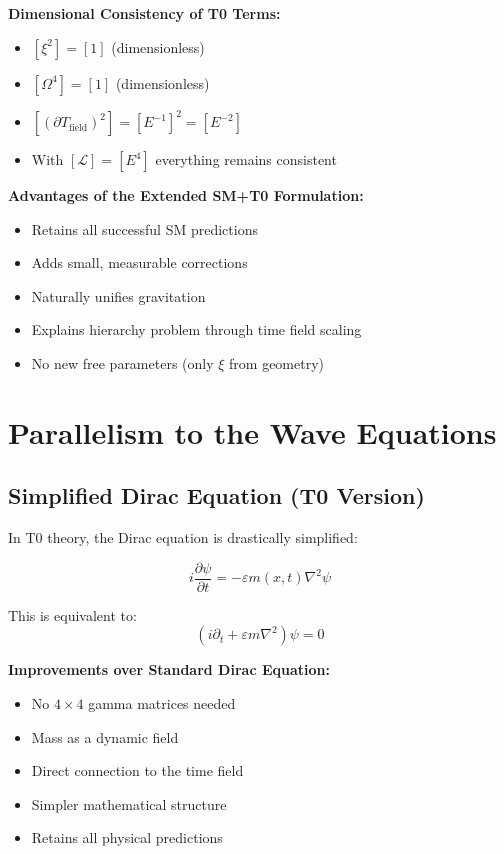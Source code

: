 	\textbf{Dimensional Consistency of T0 Terms:}
	\begin{itemize}
		\item $[\xi^2] = [1]$ (dimensionless)
		\item $[\Omega^4] = [1]$ (dimensionless)
		\item $[(\partial T_{\text{field}})^2] = [E^{-1}]^2 = [E^{-2}]$
		\item With $[\mathcal{L}] = [E^4]$ everything remains consistent
	\end{itemize}
	
	\textbf{Advantages of the Extended SM+T0 Formulation:}
	\begin{itemize}
		\item Retains all successful SM predictions
		\item Adds small, measurable corrections
		\item Naturally unifies gravitation
		\item Explains hierarchy problem through time field scaling
		\item No new free parameters (only $\xi$ from geometry)
	\end{itemize}
	
	\section{Parallelism to the Wave Equations}
	
	\subsection{Simplified Dirac Equation (T0 Version)}
	
	In T0 theory, the Dirac equation is drastically simplified:
	
	\begin{t0box}
		\begin{equation}
			i\frac{\partial\psi}{\partial t} = -\varepsilon m(x,t) \nabla^2 \psi
		\end{equation}
		
		This is equivalent to:
		\begin{equation}
			(i\partial_t + \varepsilon m \nabla^2)\psi = 0
		\end{equation}
	\end{t0box}
	
	\textbf{Improvements over Standard Dirac Equation:}
	\begin{itemize}
		\item No $4 \times 4$ gamma matrices needed
		\item Mass as a dynamic field
		\item Direct connection to the time field
		\item Simpler mathematical structure
		\item Retains all physical predictions
	\end{itemize}
	
